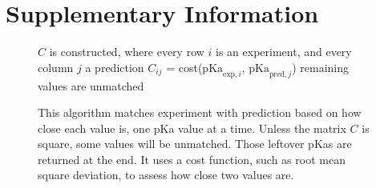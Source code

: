 \documentclass[9pt,lineno,final]{elife}
\newcommand{\pKa}{\mathrm{pKa}}
\begin{document}
\nocite{*} %




\appendix

\section{Supplementary Information}



% 

\begin{figure}

\begin{algorithm}[H]
	\SetAlgoLined
	\caption{This algorithm matches experiment with prediction based on how close each value is, one pKa value at a time. Unless the matrix $C$ is square, some values will be unmatched. Those leftover pKas are returned at the end. It uses a cost function, such as root mean square deviation, to assess how close two values are.}
	\label{alg:closest}
	 
	$C$ is constructed, where every row  $i$ is an experiment, and every column $j$ a prediction\;
	$C_{ij}$ = cost($\pKa_{\text{exp},i}$, $\pKa_{\text{pred},j}$)\;
	remaining values are unmatched\;
\label{alg:closest}
\end{algorithm}
\end{figure}
\end{document}
